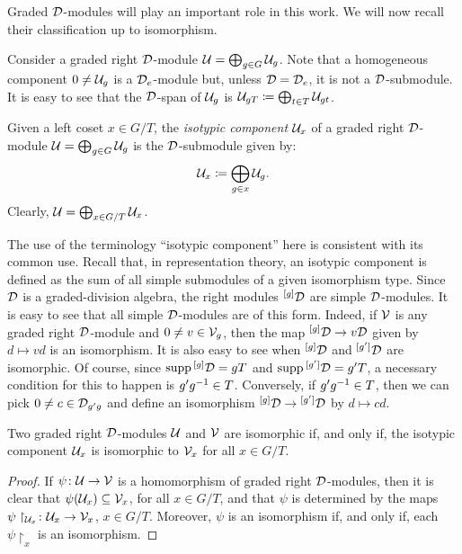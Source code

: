 Graded $\mathcal{D}$-modules will play an important role in this work. 
We will now recall their classification up to isomorphism. 

Consider a graded right $\mathcal{D}$-module $\mathcal U = \bigoplus_{g\in G} \mathcal U_g$. 
Note that a homogeneous component $0\neq \mathcal U_g$ is a $\mathcal{D}_e$-module but, unless $\mathcal{D} = \mathcal{D}_e$, it is not a $\mathcal{D}$-submodule.
It is easy to see that the $\mathcal{D}$-span of $\mathcal U_g$ is $\mathcal U_{gT} \coloneqq \bigoplus_{t\in T} \mathcal U_{gt}$. 

\begin{defi}
    Given a left coset $x\in G/T$, the \emph{isotypic component} $\mathcal U_x$ of a graded right $\mathcal{D}$-module $\mathcal U = \bigoplus_{g\in G} \mathcal U_g$ is the $\mathcal{D}$-submodule given by:
    \[
        \mathcal U_{x} \coloneqq \bigoplus_{g\in x} \mathcal U_{g}.
    \]
    Clearly, $\mathcal U = \bigoplus_{x\in G/T} \mathcal U_x$.
\end{defi}


\begin{remark}
    The use of the terminology ``isotypic component'' here is consistent with its common use. 
    Recall that, in representation theory, an isotypic component is defined as the sum of all simple submodules of a given isomorphism type. 
    Since $\mathcal{D}$ is a graded-division algebra, the right modules ${}^{[g]}\mathcal{D}$ are simple $\mathcal{D}$-modules. 
    It is easy to see that all simple $\mathcal{D}$-modules are of this form.
    Indeed, if $\mathcal V$ is any graded right $\mathcal{D}$-module and $0\neq v \in \mathcal V_g$, then the map ${}^{[g]}\mathcal{D} \to v\mathcal{D}$ given by $d \mapsto vd$ is an isomorphism. 
    It is also easy to see when ${}^{[g]}\mathcal{D}$ and ${}^{[g']}\mathcal{D}$ are isomorphic. 
    Of course, since $\operatorname{supp} {}^{[g]}\mathcal{D} = gT$ and $\operatorname{supp} {}^{[g']}\mathcal{D} = g'T$, a necessary condition for this to happen is $g'g^{-1} \in T$. 
    Conversely, if $g'g^{-1} \in T$, then we can pick $0\neq c \in \mathcal{D}_{g'g}$ and define an isomorphism ${}^{[g]}\mathcal{D} \to {}^{[g']}\mathcal{D}$ by $d \mapsto cd$.
\end{remark}

\begin{lemma}\label{lemma:iso-D-modules}
    Two graded right $\mathcal{D}$-modules $\mathcal U$ and $\mathcal V$ are isomorphic if, and only if, the isotypic component $\mathcal U_x$ is isomorphic to $\mathcal V_x$ for all $x \in G/T$. 
\end{lemma}

\begin{proof}
    If $\psi\colon \mathcal U \to \mathcal V$ is a homomorphism of graded right $\mathcal{D}$-modules, then it is clear that $\psi (\mathcal U_x) \subseteq \mathcal V_x$, for all $x \in G/T$, and that $\psi$ is determined by the maps $\psi\restriction_{\mathcal U_x} \colon \mathcal U_x \to \mathcal V_x$, $x \in G/T$. 
    Moreover, $\psi$ is an isomorphism if, and only if, each $\psi\restriction_x$ is an isomorphism.
\end{proof}

